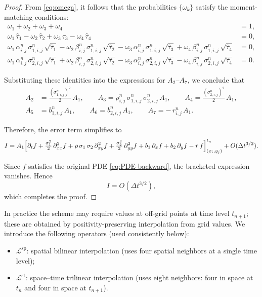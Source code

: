 \documentclass[11pt]{article}
\theoremstyle{mythm}
\theoremstyle{definition}
\begin{document}
\begin{proof}
		From \eqref{eq:omega}, it follows that the probabilities $\{\omega_k\}$ satisfy the moment-matching conditions:
		\[
		\begin{aligned}
			\omega_1 + \omega_2 + \omega_3 + \omega_4 &= 1,\\
			\omega_1\,\hat{\tau}_1 - \omega_2\,\hat{\tau}_2
			+ \omega_3\,\hat{\tau}_3 - \omega_4\,\hat{\tau}_4 &= 0,\\
			\omega_1\,\alpha_{i,j}^n\,\sigma_{1,i,j}^n\,\sqrt{\hat\tau_1}
			- \omega_2\,\beta_{i,j}^n\,\sigma_{1,i,j}^n\,\sqrt{\hat\tau_2}
			- \omega_3\,\alpha_{i,j}^n\,\sigma_{1,i,j}^n\,\sqrt{\hat\tau_3}
			+ \omega_4\,\beta_{i,j}^n\,\sigma_{1,i,j}^n\,\sqrt{\hat\tau_4} &= 0,\\
			\omega_1\,\alpha_{i,j}^n\,\sigma_{2,i,j}^n\,\sqrt{\hat\tau_1}
			+ \omega_2\,\beta_{i,j}^n\,\sigma_{2,i,j}^n\,\sqrt{\hat\tau_2}
			- \omega_3\,\alpha_{i,j}^n\,\sigma_{2,i,j}^n\,\sqrt{\hat\tau_3}
			- \omega_4\,\beta_{i,j}^n\,\sigma_{2,i,j}^n\,\sqrt{\hat\tau_4} &= 0.
		\end{aligned}
		\]
		
		Substituting these identities into the expressions for $A_2$--$A_7$, we conclude that
		\[
		\begin{aligned}
			A_2 &= \tfrac{(\sigma_{1,i,j}^n)^2}{2}\,A_1,\qquad 
			A_3 = \rho_{i,j}^n\,\sigma_{1,i,j}^n\,\sigma_{2,i,j}^n\,A_1,\qquad
			A_4 = \tfrac{(\sigma_{2,i,j}^n)^2}{2}\,A_1,\\
			A_5 &= b_{1,i,j}^n\,A_1,\qquad 
			A_6 = b_{2,i,j}^n\,A_1,\qquad 
			A_7 = -\,r_{i,j}^n\,A_1.
		\end{aligned}
		\]
		
		Therefore, the error term simplifies to
		\[
		I = A_1\Bigl[\partial_t f + \tfrac{\sigma_1^2}{2}\,\partial_{xx}^2 f
		+ \rho\,\sigma_1\,\sigma_2\,\partial_{xy}^2 f 
		+ \tfrac{\sigma_2^2}{2}\,\partial_{yy}^2 f
		+ b_1\,\partial_x f + b_2\,\partial_y f - r\,f\Bigr]_{(x_i,y_j)}^{t_n}
		+ O(\Delta t^{3/2}).
		\]
		
		Since $f$ satisfies the original PDE \eqref{eq:PDE-backward}, the bracketed expression vanishes. Hence
		\[
		I = O(\Delta t^{3/2}),
		\]
		which completes the proof.
	\end{proof}
	In practice the scheme may require values at off-grid points at time level $t_{n+1}$; these are obtained by positivity-preserving interpolation from grid values. We introduce the following operators (used consistently below):
	
	\begin{itemize}
		\item $\mathcal{L}^{\mathrm{sp}}$: spatial bilinear interpolation (uses four spatial neighbors at a single time level);
		\item $\mathcal{L}^{\mathrm{st}}$: space--time trilinear interpolation (uses eight neighbors: four in space at $t_n$ and four in space at $t_{n+1}$).
	\end{itemize}
	
\end{document}
